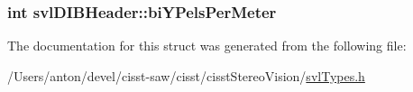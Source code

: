 \subsubsection[{bi\+Y\+Pels\+Per\+Meter}]{\setlength{\rightskip}{0pt plus 5cm}int svl\+D\+I\+B\+Header\+::bi\+Y\+Pels\+Per\+Meter}\label{structsvl_d_i_b_header_a9a1b75645d1f907fd4ee74041273d48b}


The documentation for this struct was generated from the following file\+:\begin{DoxyCompactItemize}
\item 
/\+Users/anton/devel/cisst-\/saw/cisst/cisst\+Stereo\+Vision/\hyperlink{svl_types_8h}{svl\+Types.\+h}\end{DoxyCompactItemize}
